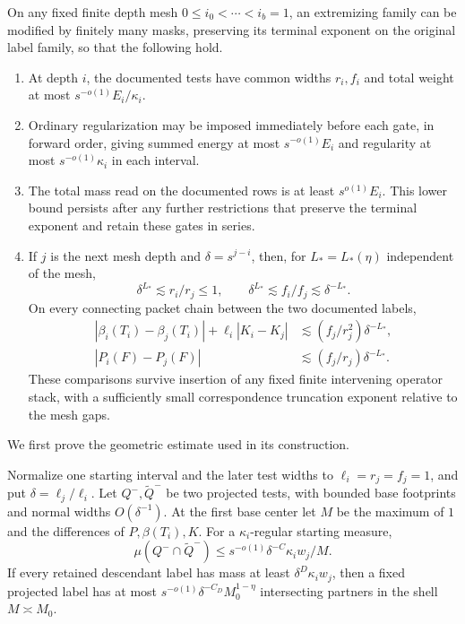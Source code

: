 \begin{proposition}\label{cyl:matched-chain}
On any fixed finite depth mesh $0\le i_0<\cdots<i_b=1$, an extremizing
family can be modified by finitely many masks, preserving its terminal
exponent on the original label family, so that the following hold.
\begin{enumerate}[label=\textup{(\roman*)}]
\item At depth $i$, the documented tests have common widths $r_i,f_i$
and total weight at most $s^{-o(1)}E_i/\kappa_i$.
\item Ordinary regularization may be imposed immediately before each
gate, in forward order, giving summed energy at most $s^{-o(1)}E_i$
and regularity at most $s^{-o(1)}\kappa_i$ in each interval.
\item The total mass read on the documented rows is at least
$s^{o(1)}E_i$.  This lower bound persists after any further restrictions
that preserve the terminal exponent and retain these gates in series.
\item If $j$ is the next mesh depth and $\delta=s^{j-i}$, then, for
$L_*=L_*(\eta)$ independent of the mesh,
\[
 \delta^{L_*}\lesssim r_i/r_j\le1,\qquad
 \delta^{L_*}\lesssim f_i/f_j\lesssim\delta^{-L_*}.
\]
On every connecting packet chain between the two documented labels,
\begin{equation}\tag{M}\label{eq:M}
 \begin{split}
 |\beta_i(T_i)-\beta_j(T_i)|+\ell_i|K_i-K_j|
       &\lesssim(f_j/r_j^2)\delta^{-L_*},\\
 |P_i(F)-P_j(F)|&\lesssim(f_j/r_j)\delta^{-L_*}.
 \end{split}
\end{equation}
These comparisons survive insertion of any fixed finite intervening
operator stack, with a sufficiently small correspondence truncation
exponent relative to the mesh gaps.
\end{enumerate}
\end{proposition}

We first prove the geometric estimate used in its construction.

\begin{lemma}\label{cyl:intersection}
Normalize one starting interval and the later test widths to
$\ell_i=r_j=f_j=1$, and put $\delta=\ell_j/\ell_i$.
Let $Q^-,\widetilde Q^-$ be two projected tests, with bounded base
footprints and normal widths $O(\delta^{-1})$.  At the first base center
let $M$ be the maximum of $1$ and the differences of $P,\beta(T_i),K$.
For a $\kappa_i$-regular starting measure,
\begin{equation}\tag{I}\label{eq:I}
 \mu(Q^-\cap\widetilde Q^-)
       \le s^{-o(1)}\delta^{-C}\kappa_i w_j/M.
\end{equation}
If every retained descendant label has mass at least
$\delta^D\kappa_iw_j$, then a fixed projected label has at most
$s^{-o(1)}\delta^{-C_D}M_0^{1-\eta}$ intersecting partners in the
shell $M\asymp M_0$.
\end{lemma}

